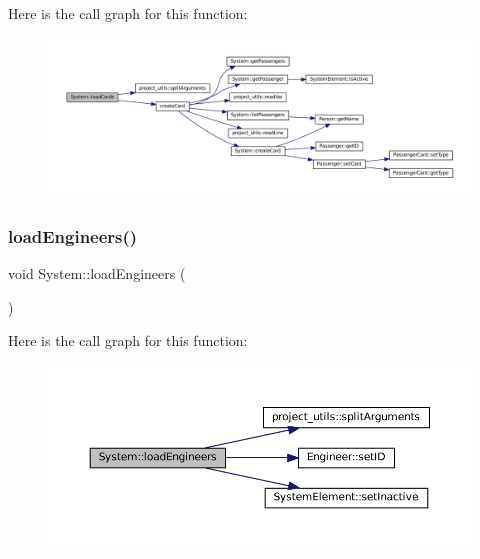 Here is the call graph for this function\+:
\nopagebreak
\begin{figure}[H]
\begin{center}
\leavevmode
\includegraphics[width=350pt]{classSystem_a32ef7e1c914ff8a237bc28de8c6aeedf_cgraph}
\end{center}
\end{figure}
\mbox{\label{classSystem_a68bb6ac77ce0de562c408968488037f9}} 
\subsubsection{\texorpdfstring{load\+Engineers()}{loadEngineers()}}
{\footnotesize\ttfamily void System\+::load\+Engineers (\begin{DoxyParamCaption}{ }\end{DoxyParamCaption})}

Here is the call graph for this function\+:
\nopagebreak
\begin{figure}[H]
\begin{center}
\leavevmode
\includegraphics[width=350pt]{classSystem_a68bb6ac77ce0de562c408968488037f9_cgraph}
\end{center}
\end{figure}
\mbox{\label{classSystem_a2e2da799ffbf2231bbc67eb4bc4ad4d8}} 
